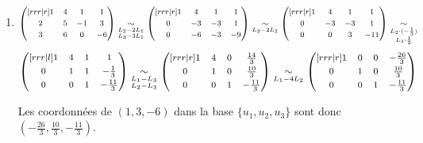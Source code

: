\documentclass[a4paper, 10pt]{report}
\begin{document}
{\begin{minipage}{0.9\textwidth}
\begin{enumerate}[label=(\roman*)]
			On en conclut que les vecteurs colonne de
			$A\ (i.e. \{u_1, u_2, u_3\})$ forment une base de
			$\mathbb{R}^3$.
			\item \[\footnotesize
				\begin{pmatrix}[rrr|r]
				1 & 4 & 1 & 1\\[0.3em]
				2 & 5 & -1 & 3\\[0.3em]
				3 & 6 & 0 & -6
			\end{pmatrix}
			\underset{\substack{L_2 - 2L_1 \\ L_3 - 3L_1}}{\sim}
			\begin{pmatrix}[rrr|r]
				1 & 4 & 1 & 1\\[0.3em]
				0 & -3 & -3 & 1\\[0.3em]
				0 & -6 & -3 & -9
			\end{pmatrix}
			\underset{\substack{L_3 - 2L_2}}{\sim}
			\begin{pmatrix}[rrr|r]
				1 & 4 & 1 & 1\\[0.3em]
				0 & -3 & -3 & 1\\[0.3em]
				0 & 0 & 3 & -11
			\end{pmatrix}
			\underset{\substack{L_2 \cdot (-\frac{1}{3})\\
					L_3 \cdot \frac{1}{3}}}{\sim}
			\]\[\footnotesize
			\begin{pmatrix}[rrr|l]
				1 & 4 & 1 & 1\\[0.3em]
				0 & 1 & 1 & -\frac{1}{3}\\[0.3em]
				0 & 0 & 1 & -\frac{11}{3}
			\end{pmatrix}
			\underset{\substack{L_1 - L_3 \\ L_2 - L_3}}{\sim}
			\begin{pmatrix}[rrr|r]
				1 & 4 & 0 & \frac{14}{3}\\[0.3em]
				0 & 1 & 0 & \frac{10}{3}\\[0.3em]
				0 & 0 & 1 & -\frac{11}{3}
			\end{pmatrix}
			\underset{\substack{L_1 - 4L_2}}{\sim}
			\begin{pmatrix}[rrr|r]
				1 & 0 & 0 & -\frac{26}{3}\\[0.3em]
				0 & 1 & 0 & \frac{10}{3}\\[0.3em]
				0 & 0 & 1 & -\frac{11}{3}
			\end{pmatrix}
			\]
						
			Les coordonnées de $(1, 3, -6)$ dans la base $\{u_1, u_2, u_3\}$
			sont donc $(-\frac{26}{3}, \frac{10}{3}, -\frac{11}{3})$.
		\end{enumerate}
	\end{minipage}}
	
\end{document}
